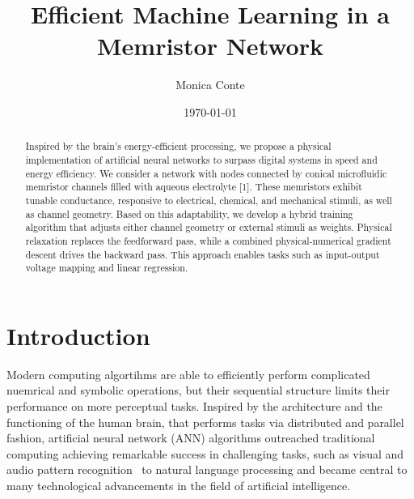 \documentclass[reprint,superscriptaddress,prb,showkeys]{revtex4-2}
\begin{document}
\title{Efficient Machine Learning in a Memristor Network}

\author{Monica Conte}

\date{\today}

\begin{abstract}
Inspired by the brain's energy-efficient processing, we propose a physical implementation of artificial neural networks to surpass digital systems in speed and energy efficiency. We consider a network with nodes connected by conical microfluidic memristor channels filled with aqueous electrolyte [1]. These memristors exhibit tunable conductance, responsive to electrical, chemical, and mechanical stimuli, as well as channel geometry. Based on this adaptability, we develop a hybrid training algorithm that adjusts either channel geometry or external stimuli as weights. Physical relaxation replaces the feedforward pass, while a combined physical-numerical gradient descent drives the backward pass. This approach enables tasks such as input-output voltage mapping and linear regression.
\end{abstract}
\maketitle

\renewcommand{\figurename}{FIG.}

\section{\label{sec:Intro}Introduction}


Modern computing algortihms are able to efficiently perform complicated nuemrical and symbolic operations, but their sequential structure limits their performance on more perceptual tasks. Inspired by the architecture and the functioning of the human brain, that performs tasks via distributed and parallel fashion, artificial neural network (ANN) algorithms outreached traditional computing achieving remarkable success in challenging tasks, such as visual and audio pattern recognition~\cite{pattern_recognition,review_image_rec, speech_rec} to natural language processing and became central to many technological advancements in the field of artificial intelligence\cite{ai_tech1}.
\end{document}
